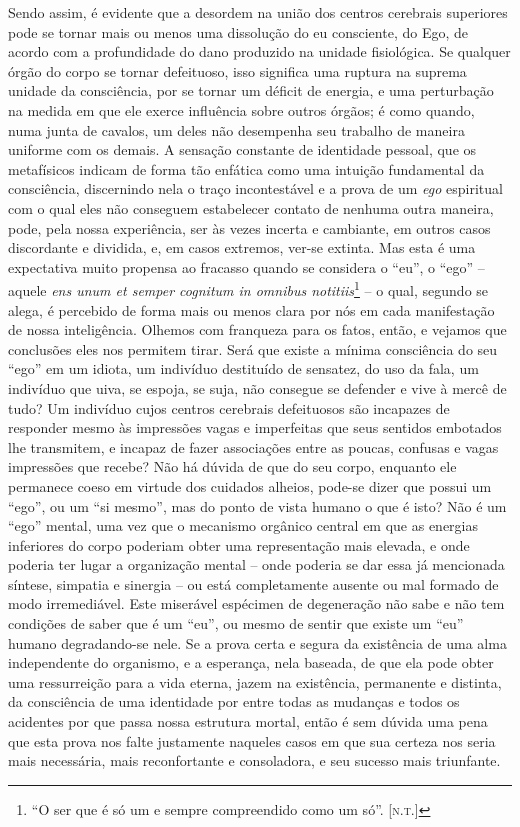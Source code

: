 Sendo assim, é evidente que a desordem na união dos centros cerebrais
superiores pode se tornar mais ou menos uma dissolução do eu
consciente, do Ego, de acordo com a profundidade do dano produzido na
unidade fisiológica.  Se qualquer órgão do corpo se tornar defeituoso,
isso significa uma ruptura na suprema unidade da consciência, por se
tornar um déficit de energia, e uma perturbação na medida em que ele
exerce influência sobre outros órgãos; é como quando, numa junta de
cavalos, um deles não desempenha seu trabalho de maneira uniforme com
os demais.  A sensação constante de identidade pessoal, que os
metafísicos indicam de forma tão enfática como uma intuição fundamental
da consciência, discernindo nela o traço incontestável e a prova de um
\textit{ego} espiritual com o qual eles não conseguem estabelecer
contato de nenhuma outra maneira, pode, pela nossa experiência, ser às
vezes incerta e cambiante, em outros casos discordante e dividida, e,
em casos extremos, ver-se extinta.  Mas esta é uma expectativa muito
propensa ao fracasso quando se considera o “eu”, o “ego” -- aquele
\textit{ens unum et semper cognitum in omnibus notitiis}\footnote{ “O ser
que é só um e sempre compreendido como um só”. [\textsc{n.t.}]}
-- o qual, segundo se alega, é percebido de forma mais ou menos clara
por nós em cada manifestação de nossa inteligência.  Olhemos com
franqueza para os fatos, então, e vejamos que conclusões eles nos
permitem tirar.  Será que existe a mínima consciência do seu “ego” em
um idiota, um indivíduo destituído de sensatez, do uso da fala, um
indivíduo que uiva, se espoja, se suja, não consegue se defender e vive
à mercê de tudo?  Um indivíduo cujos centros cerebrais defeituosos são
incapazes de responder mesmo às impressões vagas e imperfeitas que seus
sentidos embotados lhe transmitem, e incapaz de fazer associações entre
as poucas, confusas e vagas impressões que recebe?  Não há dúvida de
que do seu corpo, enquanto ele permanece coeso em virtude dos cuidados
alheios, pode-se dizer que possui um “ego”, ou um “si mesmo”, mas do
ponto de vista humano o que é isto?  Não é um “ego” mental, uma vez que
o mecanismo orgânico central em que as energias inferiores do corpo
poderiam obter uma representação mais elevada, e onde poderia ter lugar
a organização mental -- onde poderia se dar essa já mencionada síntese,
simpatia e sinergia -- ou está completamente ausente ou mal formado de
modo irremediável.  Este miserável espécimen de degeneração não sabe e
não tem condições de saber que é um “eu”, ou mesmo de sentir que existe
um “eu” humano degradando-se nele.  Se a prova certa e segura da
existência de uma alma independente do organismo, e a esperança, nela
baseada, de que ela pode obter uma ressurreição para a vida eterna,
jazem na existência, permanente e distinta, da consciência de uma
identidade por entre todas as mudanças e todos os acidentes por que
passa nossa estrutura mortal, então é sem dúvida uma pena que esta
prova nos falte justamente naqueles casos em que sua certeza nos seria
mais necessária, mais reconfortante e consoladora, e seu sucesso mais
triunfante.

